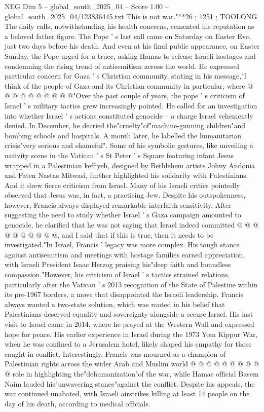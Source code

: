 \begin{textsample}{NEG Dim 5 – global\_south\_2025\_04 – Score 1.00 – global\_south\_2025\_04/123836445.txt}
This is not war."**26 ; 1251 ; TOOLONG The daily calls, notwithstanding his health concerns, cemented his reputation as a beloved father figure.
The Pope ' s last call came on Saturday on Easter Eve, just two days before his death.
And even at his final public appearance, on Easter Sunday, the Pope urged for a truce, asking Hamas to release Israeli hostages and condemning the rising trend of antisemitism across the world.
He expressed particular concern for Gaza ' s Christian community, stating in his message,"I think of the people of Gaza and its Christian community in particular, where @ @ @ @ @ @ @ @ @ @"Over the past couple of years, the pope ' s criticism of Israel ' s military tactics grew increasingly pointed.
He called for an investigation into whether Israel ' s actions constituted genocide -- a charge Israel vehemently denied.
In December, he decried the"cruelty"of"machine-gunning children"and bombing schools and hospitals.
A month later, he labelled the humanitarian crisis"very serious and shameful".
Some of his symbolic gestures, like unveiling a nativity scene in the Vatican ' s St Peter ' s Square featuring infant Jesus wrapped in a Palestinian keffiyeh, designed by Bethlehem artists Johny Andonia and Faten Nastas Mitwasi, further highlighted his solidarity with Palestinians.
And it drew fierce criticism from Israel.
Many of his Israeli critics pointedly observed that Jesus was, in fact, a practising Jew.
Despite his outspokenness, however, Francis always displayed remarkable interfaith sensitivity.
After suggesting the need to study whether Israel ' s Gaza campaign amounted to genocide, he clarified that he was not saying that Israel indeed committed @ @ @ @ @ @ @ @ @ @, and I said that if this is true, then it needs to be investigated."In Israel, Francis ' legacy was more complex.
His tough stance against antisemitism and meetings with hostage families earned appreciation, with Israeli President Isaac Herzog praising his"deep faith and boundless compassion."However, his criticism of Israel ' s tactics strained relations, particularly after the Vatican ' s 2013 recognition of the State of Palestine within its pre-1967 borders, a move that disappointed the Israeli leadership.
Francis always wanted a two-state solution, which was rooted in his belief that Palestinians deserved equality and sovereignty alongside a secure Israel.
His last visit to Israel came in 2014, where he prayed at the Western Wall and expressed hope for peace.
His earlier experience in Israel during the 1973 Yom Kippur War, when he was confined to a Jerusalem hotel, likely shaped his empathy for those caught in conflict.
Interestingly, Francis was mourned as a champion of Palestinian rights across the wider Arab and Muslim world @ @ @ @ @ @ @ @ @ @ role in highlighting the"dehumanization"of the war, while Hamas official Basem Naim lauded his"unwavering stance"against the conflict.
Despite his appeals, the war continued unabated, with Israeli airstrikes killing at least 14 people on the day of his death, according to medical officials.

\end{textsample}

